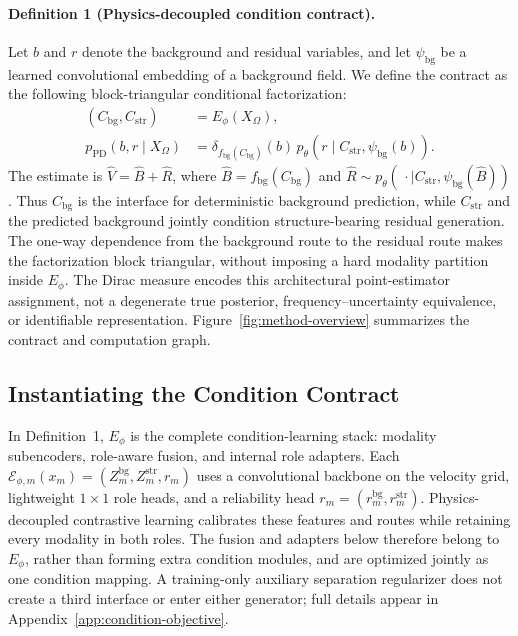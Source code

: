 \paragraph{Definition 1 (Physics-decoupled condition contract).}
Let $b$ and $r$ denote the background and residual variables, and let $\psi_{\mathrm{bg}}$ be a learned convolutional embedding of a background field. We define the contract as the following block-triangular conditional factorization:
\begin{equation}
\begin{aligned}
(C_{\mathrm{bg}},C_{\mathrm{str}})&=E_\phi(X_\Omega),\\
p_{\mathrm{PD}}(b,r\mid X_\Omega)
&=\delta_{f_{\mathrm{bg}}(C_{\mathrm{bg}})}(b)
\,p_\theta(r\mid C_{\mathrm{str}},\psi_{\mathrm{bg}}(b)).
\end{aligned}
\label{eq:asymmetric-factorization}
\end{equation}
The estimate is $\hat V=\hat B+\hat R$, where $\hat B=f_{\mathrm{bg}}(C_{\mathrm{bg}})$ and $\hat R\sim p_\theta(\,\cdot\mid C_{\mathrm{str}},\psi_{\mathrm{bg}}(\hat B))$. Thus $C_{\mathrm{bg}}$ is the interface for deterministic background prediction, while $C_{\mathrm{str}}$ and the predicted background jointly condition structure-bearing residual generation. The one-way dependence from the background route to the residual route makes the factorization block triangular, without imposing a hard modality partition inside $E_\phi$. The Dirac measure encodes this architectural point-estimator assignment, not a degenerate true posterior, frequency--uncertainty equivalence, or identifiable representation. Figure~\ref{fig:method-overview} summarizes the contract and computation graph.

\subsection{Instantiating the Condition Contract}
In Definition~1, $E_\phi$ is the complete condition-learning stack: modality subencoders, role-aware fusion, and internal role adapters. Each $\mathcal E_{\phi,m}(x_m)=(Z_m^{\mathrm{bg}},Z_m^{\mathrm{str}},r_m)$ uses a convolutional backbone on the velocity grid, lightweight $1\times1$ role heads, and a reliability head $r_m=(r_m^{\mathrm{bg}},r_m^{\mathrm{str}})$. Physics-decoupled contrastive learning calibrates these features and routes while retaining every modality in both roles. The fusion and adapters below therefore belong to $E_\phi$, rather than forming extra condition modules, and are optimized jointly as one condition mapping. A training-only auxiliary separation regularizer does not create a third interface or enter either generator; full details appear in Appendix~\ref{app:condition-objective}.

